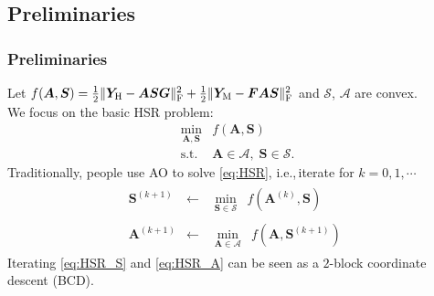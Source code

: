 \documentclass[10pt,mathserif]{beamer}
\newcommand{\YH}{\bm Y_\text H}
\newcommand{\YM}{\bm Y_\text M}
\newcommand{\Tr}{^\top}%
\newcommand{\Fr}{_\text F}
\newcommand{\iter}[1]{^{(#1)}}
\newcommand{\ie}{i.e.,\,}
\begin{document}
\subsection{Preliminaries}
    \begin{frame}
        \frametitle{Preliminaries}
        Let $f(\bm A,\bm S)
             = \frac{1}{2} \Vert \YH - \bm A \bm S \bm G \Vert\Fr^2
             + \frac{1}{2} \Vert \YM - \bm F \bm A \bm S \Vert\Fr^2$ and $\mathcal S$, $\mathcal A$ are convex. \\
        \vspace{0.3cm}
        We focus on the basic HSR problem:
        \begin{equation}
            \begin{array}{cl}
                \underset{\bm A,\bm S}{\min}
                &
                f(\bm A,\bm S) \\
                \text{s.t.}
                &
                \bm A \in \mathcal A, \; \bm S \in \mathcal S.
            \end{array}
            \label{eq:HSR}
        \end{equation}
        Traditionally, people use AO to solve \eqref{eq:HSR},
        \ie iterate for $k=0,1,\cdots$
        \begin{eqnarray}
            \bm S\iter{k+1} & \gets & \begin{array}{cl} \underset{\bm S \in \mathcal S}{\min} & f(\bm A\iter{k},\bm S)   \end{array} \label{eq:HSR_S} \\
            \bm A\iter{k+1} & \gets & \begin{array}{cl} \underset{\bm A \in \mathcal A}{\min} & f(\bm A,\bm S\iter{k+1}) \end{array} \label{eq:HSR_A}
        \end{eqnarray}
        Iterating \eqref{eq:HSR_S} and \eqref{eq:HSR_A} can be seen as a $2$-block coordinate descent (BCD).
    \end{frame}
\end{document}
